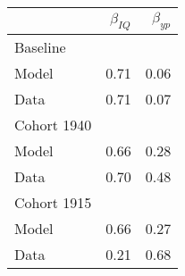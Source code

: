 \begin{tabular}{lrr}
\hline
  & $\beta_{IQ}$  & $\beta_{yp}$  \\ 
\hline
Baseline &   &   \\ 
Model & 0.71  & 0.06  \\ 
Data & 0.71  & 0.07  \\ 
Cohort 1940 &   &   \\ 
Model & 0.66  & 0.28  \\ 
Data & 0.70  & 0.48  \\ 
Cohort 1915 &   &   \\ 
Model & 0.66  & 0.27  \\ 
Data & 0.21  & 0.68  \\ 
\hline
\end{tabular}%

